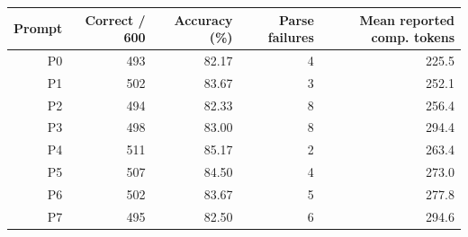 \begin{tabular}{rrrrr}
\toprule
Prompt & Correct / 600 & Accuracy (\%) & Parse failures & Mean reported comp. tokens \\
\midrule
P0 & 493 & 82.17 & 4 & 225.5 \\
P1 & 502 & 83.67 & 3 & 252.1 \\
P2 & 494 & 82.33 & 8 & 256.4 \\
P3 & 498 & 83.00 & 8 & 294.4 \\
P4 & 511 & 85.17 & 2 & 263.4 \\
P5 & 507 & 84.50 & 4 & 273.0 \\
P6 & 502 & 83.67 & 5 & 277.8 \\
P7 & 495 & 82.50 & 6 & 294.6 \\
\bottomrule
\end{tabular}